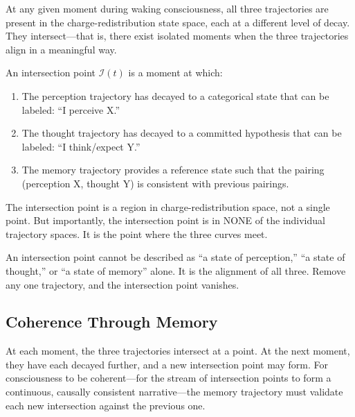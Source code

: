 At any given moment during waking consciousness, all three trajectories are present in the charge-redistribution state space, each at a different level of decay. They intersect—that is, there exist isolated moments when the three trajectories align in a meaningful way.

\begin{definition}
\label{def:intersection}
An intersection point $\mathcal{I}(t)$ is a moment at which:
\begin{enumerate}[label=(\roman*),leftmargin=*,itemsep=1pt]
\item The perception trajectory has decayed to a categorical state that can be labeled: ``I perceive X.''
\item The thought trajectory has decayed to a committed hypothesis that can be labeled: ``I think/expect Y.''
\item The memory trajectory provides a reference state such that the pairing (perception X, thought Y) is consistent with previous pairings.
\end{enumerate}

The intersection point is a region in charge-redistribution space, not a single point. But importantly, the intersection point is in NONE of the individual trajectory spaces. It is the point where the three curves meet.
\end{definition}

\begin{remark}
An intersection point cannot be described as ``a state of perception,'' ``a state of thought,'' or ``a state of memory'' alone. It is the alignment of all three. Remove any one trajectory, and the intersection point vanishes.
\end{remark}

\subsection{Coherence Through Memory}

At each moment, the three trajectories intersect at a point. At the next moment, they have each decayed further, and a new intersection point may form. For consciousness to be coherent—for the stream of intersection points to form a continuous, causally consistent narrative—the memory trajectory must validate each new intersection against the previous one.

